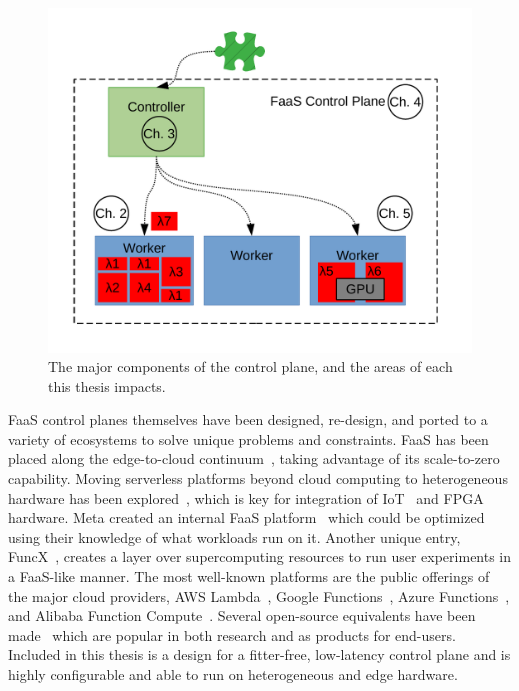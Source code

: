 \begin{figure}
  \centering
  \includegraphics[width=\textwidth]{introduction/figs/faas-labeled.pdf}
  \caption{The major components of the control plane, and the areas of each this thesis impacts.}
  \label{fig:control-plane}
\end{figure}

FaaS control planes themselves have been designed, re-design, and ported to a variety of ecosystems to solve unique problems and constraints.
FaaS has been placed along the edge-to-cloud continuum~\cite{cicconetti2020decentralized,russo2023serverless,cheng2019fog,wang2020supporting}, taking advantage of its scale-to-zero capability.
Moving serverless platforms beyond cloud computing to heterogeneous hardware has been explored~\cite{du2022serverless}, which is key for integration of IoT~\cite{persson2017kappa,trilles2020iot,cheng2019fog,wang2020supporting} and FPGA~\cite{bacis2020blastfunction,ringlein2021case} hardware.
Meta created an internal FaaS platform~\cite{sahraei2023xfaas} which could be optimized using their knowledge of what workloads run on it.
Another unique entry, FuncX~\cite{funcx_hpdc_20}, creates a layer over supercomputing resources to run user experiments in a FaaS-like manner.
The most well-known platforms are the public offerings of the major cloud providers, AWS Lambda~\cite{lambda}, Google Functions~\cite{gcp-functions}, Azure Functions~\cite{azure-functions}, and Alibaba Function Compute~\cite{alibaba-compute}.
Several open-source equivalents have been made~\cite{openwhisk,openfaas,nuclio,knative} which are popular in both research and as products for end-users.
Included in this thesis is a design for a fitter-free, low-latency control plane and is highly configurable and able to run on heterogeneous and edge hardware.

